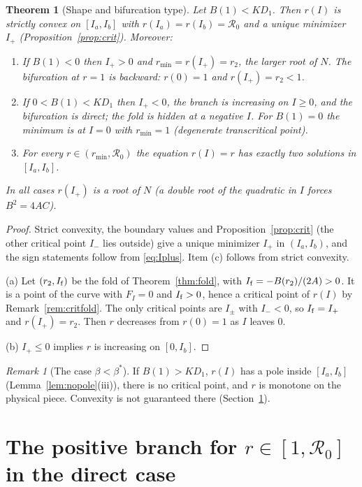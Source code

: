 \documentclass[11pt]{article}
\newtheorem{theorem}[lemma]{Theorem}
\theoremstyle{remark}
\newtheorem{remark}[lemma]{Remark}
\newcommand{\R}{\mathcal R_0}
\begin{document}
\begin{theorem}[Shape and bifurcation type]\label{thm:shape}
Let $B(1)<KD_1$. Then $r(I)$ is strictly convex on $[I_a,I_b]$ with $r(I_a)=r(I_b)=\R$ and a unique minimizer $I_+$ (Proposition~\ref{prop:crit}). Moreover:
\begin{enumerate}
\item[(a)] If $B(1)<0$ then $I_+>0$ and $r_{\min}=r(I_+)=r_2$, the larger root of $N$. The bifurcation at $r=1$ is backward: $r(0)=1$ and $r(I_+)=r_2<1$.
\item[(b)] If $0<B(1)<KD_1$ then $I_+<0$, the branch is increasing on $I\ge0$, and the bifurcation is direct; the fold is hidden at a negative $I$. For $B(1)=0$ the minimum is at $I=0$ with $r_{\min}=1$ (degenerate transcritical point).
\item[(c)] For every $r\in(r_{\min},\R)$ the equation $r(I)=r$ has exactly two solutions in $[I_a,I_b]$.
\end{enumerate}
In all cases $r(I_+)$ is a root of $N$ (a double root of the quadratic in $I$ forces $B^2=4AC$).
\end{theorem}
\begin{proof}
Strict convexity, the boundary values and Proposition~\ref{prop:crit} (the other critical point $I_-$ lies outside) give a unique minimizer $I_+$ in $(I_a,I_b)$, and the sign statements follow from \eqref{eq:Iplus}. Item (c) follows from strict convexity.

(a) Let $(r_2,I_{\rm f})$ be the fold of Theorem~\ref{thm:fold}, with $I_{\rm f}=-B(r_2)/(2A)>0$. It is a point of the curve with $F_I=0$ and $I_{\rm f}>0$, hence a critical point of $r(I)$ by Remark~\ref{rem:critfold}. The only critical points are $I_\pm$ with $I_-<0$, so $I_{\rm f}=I_+$ and $r(I_+)=r_2$. Then $r$ decreases from $r(0)=1$ as $I$ leaves $0$.

(b) $I_+\le0$ implies $r$ is increasing on $[0,I_b]$.
\end{proof}

\begin{remark}[The case $\beta<\beta^*$]
If $B(1)>KD_1$, $r(I)$ has a pole inside $[I_a,I_b]$ (Lemma~\ref{lem:nopole}(iii)), there is no critical point, and $r$ is monotone on the physical piece. Convexity is not guaranteed there (Section~\ref{sec:direct}).
\end{remark}

\section{The positive branch for $r\in[1,\R]$ in the direct case}\label{sec:direct}
\end{document}

